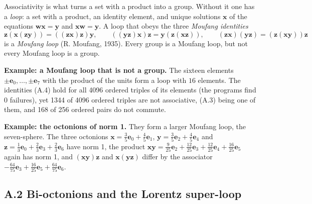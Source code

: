 \documentclass[
  10pt,
]{article}
\begin{document}
Associativity is what turns a set with a product into a group. Without
it one has a \emph{loop}: a set with a product, an identity element, and
unique solutions \(\mathbf x\) of the equations
\(\mathbf w\mathbf x=\mathbf y\) and \(\mathbf x\mathbf w=\mathbf y\). A
loop that obeys the three \emph{Moufang identities}
\[\mathbf z(\mathbf x(\mathbf z\mathbf y))=((\mathbf z\mathbf x)\mathbf z)\mathbf y,\qquad((\mathbf y\mathbf z)\mathbf x)\mathbf z=\mathbf y(\mathbf z(\mathbf x\mathbf z)),\qquad(\mathbf z\mathbf x)(\mathbf y\mathbf z)=(\mathbf z(\mathbf x\mathbf y))\mathbf z\tag{A.4}\]
is a \emph{Moufang loop} (R. Moufang, 1935). Every group is a Moufang
loop, but not every Moufang loop is a group.

\textbf{Example: a Moufang loop that is not a group.} The sixteen
elements \(\pm\mathbf e_0,\dots,\pm\mathbf e_7\) with the product of the
units form a loop with \(16\) elements. The identities (A.4) hold for
all 4096 ordered triples of its elements (the programs find \(0\)
failures), yet 1344 of 4096 ordered triples are not associative, (A.3)
being one of them, and 168 of 256 ordered pairs do not commute.

\textbf{Example: the octonions of norm 1.} They form a larger Moufang
loop, the seven-sphere. The three octonions
\(\mathbf x=\tfrac{3}{5}\mathbf e_{0}+\tfrac{4}{5}\mathbf e_{1}\),
\(\mathbf y=\tfrac{3}{5}\mathbf e_{2}+\tfrac{4}{5}\mathbf e_{4}\) and
\(\mathbf z=\tfrac{1}{3}\mathbf e_{0}+\tfrac{2}{3}\mathbf e_{3}+\tfrac{2}{3}\mathbf e_{6}\)
have norm 1, the product
\(\mathbf x\mathbf y=\tfrac{9}{25}\mathbf e_{2}+\tfrac{12}{25}\mathbf e_{3}+\tfrac{12}{25}\mathbf e_{4}+\tfrac{16}{25}\mathbf e_{5}\)
again has norm 1, and \((\mathbf x\mathbf y)\mathbf z\) and
\(\mathbf x(\mathbf y\mathbf z)\) differ by the associator
\(-\tfrac{64}{75}\mathbf e_{3}+\tfrac{16}{25}\mathbf e_{5}+\tfrac{64}{75}\mathbf e_{6}\).

\hypertarget{a.2-bi-octonions-and-the-lorentz-super-loop}{%
\subsection{A.2 Bi-octonions and the Lorentz
super-loop}\label{a.2-bi-octonions-and-the-lorentz-super-loop}}
\end{document}
